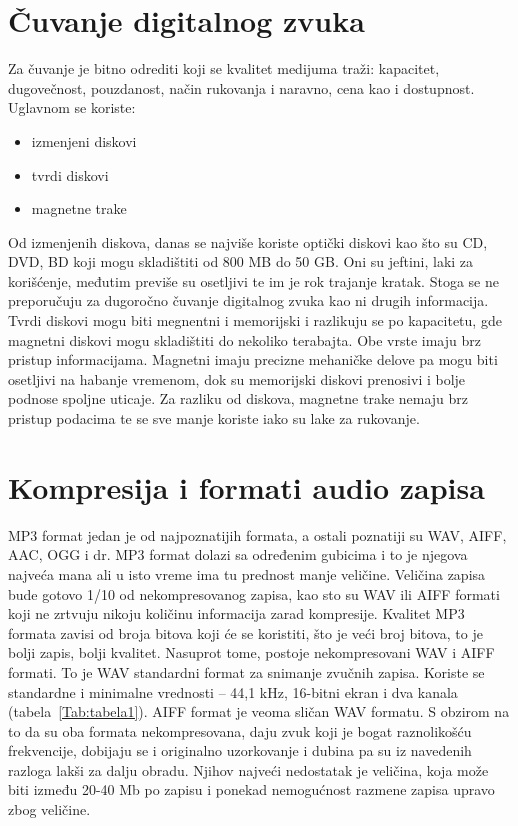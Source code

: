 \documentclass[a4paper]{article}
\begin{document}
    \section{Čuvanje digitalnog zvuka}
    Za čuvanje je bitno odrediti koji se kvalitet medijuma traži: kapacitet, dugovečnost, pouzdanost, način rukovanja i naravno, cena kao i dostupnost. Uglavnom se koriste:
    \begin{itemize}
        \item izmenjeni diskovi
        \item tvrdi diskovi
        \item magnetne trake
    \end{itemize}
Od izmenjenih diskova, danas se najviše koriste optički diskovi kao što su CD, DVD, BD koji mogu skladištiti od 800 MB do 50 GB. Oni su jeftini, laki za korišćenje, međutim previše su osetljivi te im je rok trajanje kratak. Stoga se ne preporučuju za dugoročno čuvanje digitalnog zvuka kao ni drugih informacija. 
Tvrdi diskovi mogu biti megnentni i memorijski i razlikuju se po kapacitetu, gde magnetni diskovi mogu skladištiti do nekoliko terabajta. Obe vrste imaju brz pristup informacijama. Magnetni imaju precizne mehaničke delove pa mogu biti osetljivi na habanje vremenom, dok su memorijski diskovi prenosivi i bolje podnose spoljne uticaje. 
Za razliku od diskova, magnetne trake nemaju brz pristup podacima te se sve manje koriste iako su lake za rukovanje.\cite{jurkovic2021digitalizacija} 

        \section{Kompresija i formati audio zapisa}
    MP3 format jedan je od najpoznatijih formata, a ostali poznatiji su WAV, AIFF, AAC,
    OGG i dr. MP3 format dolazi sa određenim gubicima i to je njegova najveća mana ali u isto vreme ima tu prednost manje veličine. Veličina zapisa bude gotovo 1/10 od nekompresovanog zapisa, kao sto su WAV ili AIFF formati koji ne zrtvuju nikoju količinu informacija zarad kompresije. Kvalitet
    MP3 formata zavisi od broja bitova koji će se koristiti, što je veći broj bitova, to je bolji zapis,
    bolji kvalitet. Nasuprot tome, postoje nekompresovani WAV i AIFF formati. To je WAV
    standardni format za snimanje zvučnih zapisa. Koriste se standardne i minimalne
    vrednosti – 44,1 kHz, 16-bitni ekran i dva kanala (tabela~\ref{Tab:tabela1}). AIFF format je veoma sličan WAV formatu.
    S obzirom na to da su oba formata nekompresovana, daju zvuk koji je bogat raznolikošću
    frekvencije, dobijaju se i originalno uzorkovanje i dubina pa su iz navedenih razloga
    lakši za dalju obradu. Njihov najveći nedostatak je veličina, koja može biti između 20-40 Mb po
        zapisu i ponekad nemogućnost razmene zapisa upravo zbog veličine\cite{10.17632/rwbs7645hg.4}.
    
\end{document}
